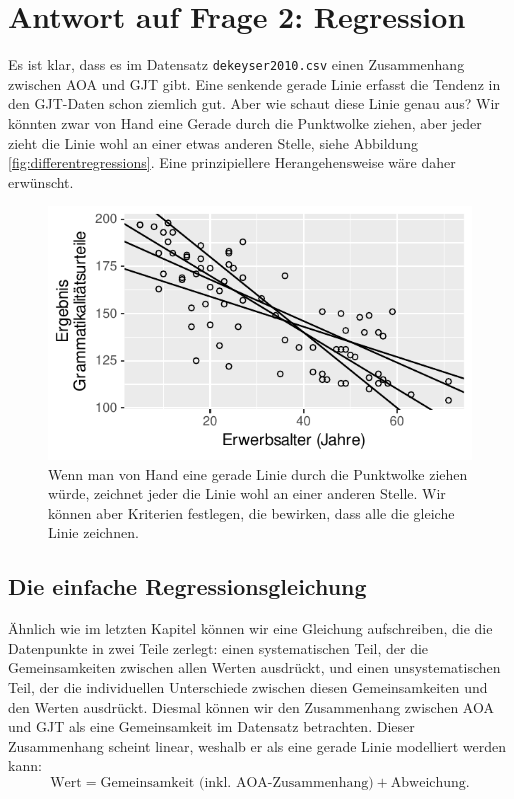 \documentclass[oneside, 10pt]{book}\usepackage[]{graphicx}\usepackage[]{xcolor}
\newenvironment{knitrout}{}{} %
\begin{document}
\section{Antwort auf Frage 2: Regression}
Es ist klar, dass es im Datensatz \texttt{dekeyser2010.csv}
einen Zusammenhang zwischen AOA und GJT gibt.
Eine senkende gerade Linie erfasst die Tendenz in den
GJT-Daten schon ziemlich gut. Aber wie schaut diese Linie genau aus?
Wir könnten zwar von Hand eine Gerade durch die Punktwolke
ziehen, aber jeder zieht die Linie wohl an einer etwas anderen Stelle,
siehe Abbildung \ref{fig:differentregressions}.
Eine prinzipiellere Herangehensweise wäre daher erwünscht.

\begin{knitrout}
\color{fgcolor}\begin{figure}[tp]

{\centering \includegraphics[width=.6\textwidth]{figs/unnamed-chunk-195-1} 

}

\caption{Wenn man von Hand eine gerade Linie durch die Punktwolke ziehen würde, zeichnet jeder die Linie wohl an einer anderen Stelle. Wir können aber Kriterien festlegen, die bewirken, dass alle die gleiche Linie zeichnen.\label{fig:differentregressions}}\label{fig:unnamed-chunk-195}
\end{figure}

\end{knitrout}

\subsection{Die einfache Regressionsgleichung}
Ähnlich wie im letzten Kapitel können wir eine Gleichung
aufschreiben, die die Datenpunkte in zwei Teile zerlegt:
einen systematischen Teil, der die Gemeinsamkeiten zwischen allen Werten ausdrückt,
und einen unsystematischen Teil, der die individuellen Unterschiede zwischen diesen
Gemeinsamkeiten und den Werten ausdrückt. Diesmal können
wir den Zusammenhang zwischen AOA und GJT als eine Gemeinsamkeit
im Datensatz betrachten. Dieser Zusammenhang scheint linear,
weshalb er als eine gerade Linie modelliert werden kann:
\[
\textrm{Wert} = \textrm{Gemeinsamkeit (inkl. AOA-Zusammenhang)} + \textrm{Abweichung}.
\]
\end{document}
